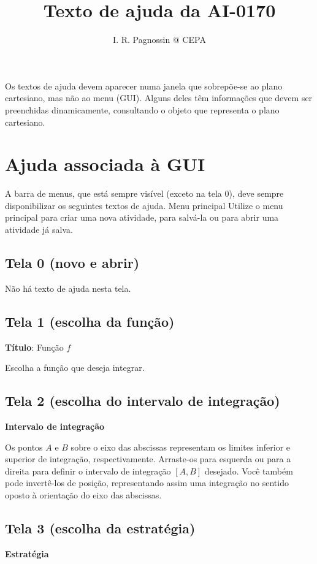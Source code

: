 \documentclass[a4paper,10pt]{scrartcl}
\title{Texto de ajuda da AI-0170}
\author{I. R. Pagnossin @ CEPA}
\begin{document}
\maketitle

\begin{abstract}

\end{abstract}

	Os textos de ajuda devem aparecer numa janela que sobrepõe-se ao plano cartesiano, mas não ao menu (GUI). Alguns deles têm informações que devem ser preenchidas dinamicamente, consultando o objeto que representa o plano cartesiano.

  \section*{Ajuda associada à GUI}
	A barra de menus, que está sempre visível (exceto na tela 0), deve sempre disponibilizar os seguintes textos de ajuda.
Menu principal
	Utilize o menu principal para criar uma nova atividade, para salvá-la ou para abrir uma atividade já salva.


  \subsection*{Tela 0 (novo e abrir)}
    Não há texto de ajuda nesta tela.
	
  \subsection*{Tela 1 (escolha da função)}
    \textbf{Título}: Função $f$

    Escolha a função que deseja integrar.

  \subsection*{Tela 2 (escolha do intervalo de integração)}
    \textbf{Intervalo de integração}

    Os pontos $A$ e $B$ sobre o eixo das abscissas representam os limites inferior e superior de integração, respectivamente. Arraste-os para esquerda ou para a direita para definir o intervalo de integração $[A,B]$ desejado. Você também pode invertê-los de posição, representando assim uma integração no sentido oposto à orientação do eixo das abscissas.

  \subsection*{Tela 3 (escolha da estratégia)}
    \textbf{Estratégia}
\end{document}
